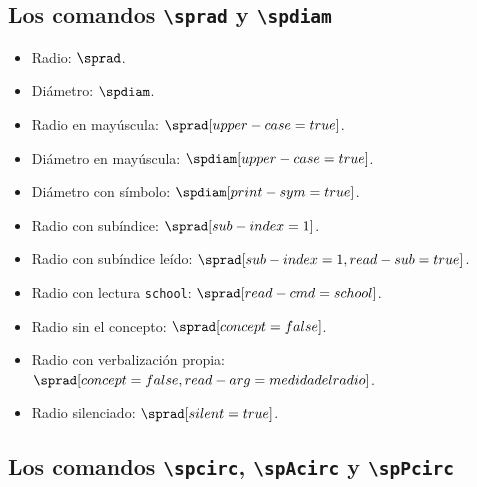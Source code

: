 \documentclass{article}
\begin{document}
\subsection*{Los comandos \texttt{\textbackslash sprad} y \texttt{\textbackslash spdiam}}

\begin{itemize}
  \item Radio: $\sprad$.
  \item Diámetro: $\spdiam$.
  \item Radio en mayúscula: $\sprad[upper-case=true]$.
  \item Diámetro en mayúscula: $\spdiam[upper-case=true]$.
  \item Diámetro con símbolo: $\spdiam[print-sym=true]$.
  \item Radio con subíndice: $\sprad[sub-index={1}]$.
  \item Radio con subíndice leído: $\sprad[sub-index={1},read-sub=true]$.
  \item Radio con lectura \texttt{school}: $\sprad[read-cmd=school]$.
  \item Radio sin el concepto: $\sprad[concept=false]$.
  \item Radio con verbalización propia: $\sprad[concept=false,read-arg={medida del radio}]$.
  \item Radio silenciado: $\sprad[silent=true]$.
\end{itemize}

\subsection*{Los comandos \texttt{\textbackslash spcirc}, \texttt{\textbackslash spAcirc} y \texttt{\textbackslash spPcirc}}
\end{document}
